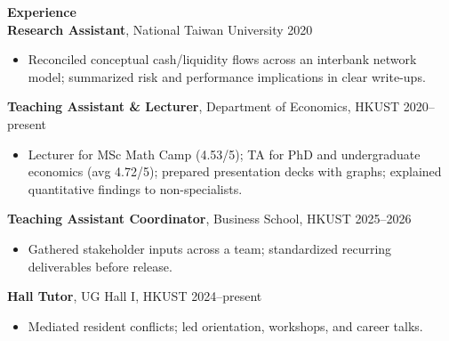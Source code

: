 \documentclass[11pt,letterpaper]{article}
\begin{document}
{\large \textbf{Experience}}\\[-0.5pt]
\textbf{Research Assistant}, National Taiwan University \hfill 2020\\
\vspace{-6pt}
\begin{itemize}
  \item Reconciled conceptual cash/liquidity flows across an interbank network model; summarized risk and performance implications in clear write-ups.
\end{itemize}
\textbf{Teaching Assistant \& Lecturer}, Department of Economics, HKUST \hfill 2020--present\\
\vspace{-6pt}
\begin{itemize}
  \item Lecturer for MSc Math Camp (4.53/5); TA for PhD and undergraduate economics (avg 4.72/5); prepared presentation decks with graphs; explained quantitative findings to non-specialists.
\end{itemize}
\textbf{Teaching Assistant Coordinator}, Business School, HKUST \hfill 2025--2026\\
\vspace{-6pt}
\begin{itemize}
  \item Gathered stakeholder inputs across a team; standardized recurring deliverables before release.
\end{itemize}
\textbf{Hall Tutor}, UG Hall I, HKUST \hfill 2024--present\\
\vspace{-6pt}
\begin{itemize}
  \item Mediated resident conflicts; led orientation, workshops, and career talks.
\end{itemize}

\vspace{0.15pt}
\end{document}
